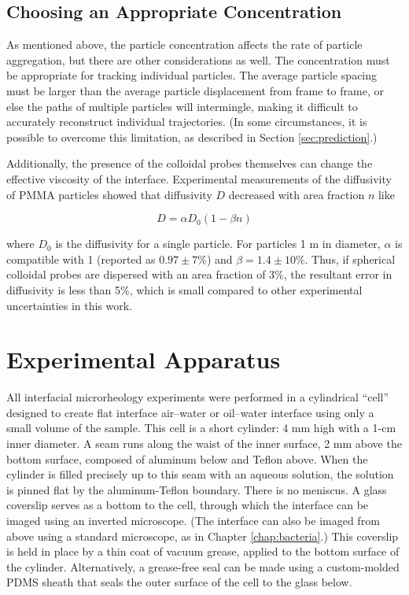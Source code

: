 \subsection{Choosing an Appropriate Concentration}

As mentioned above, the particle concentration affects the rate of particle aggregation, but there are other considerations as well. The concentration must be appropriate for tracking individual particles. The average particle spacing must be larger than the average particle displacement from frame to frame, or else the paths of multiple particles will intermingle, making it difficult to accurately reconstruct individual trajectories\cite{Crocker1996}. (In some circumstances, it is possible to overcome this limitation, as described in Section \ref{sec:prediction}.)

Additionally, the presence of the colloidal probes themselves can change the effective viscosity of the interface. Experimental measurements of the diffusivity of PMMA particles showed that diffusivity $D$ decreased with area fraction $n$ like

\begin{equation}
D = \alpha D_0(1 - \beta n)
\end{equation}

\noindent where $D_0$ is the diffusivity for a single particle. For particles 1 \textmu m in diameter, $\alpha$ is compatible with 1 (reported as $0.97 \pm 7\%$) and $\beta = 1.4 \pm 10\%$\cite{Peng2008a}. Thus, if spherical colloidal probes are dispersed with an area fraction of 3\%, the resultant error in diffusivity is less than 5\%, which is small compared to other experimental uncertainties in this work.

\section{Experimental Apparatus}

All interfacial microrheology experiments were performed in a cylindrical ``cell'' designed to create flat interface air--water or oil--water interface using only a small volume of the sample. This cell is a short cylinder: 4 mm high with a 1-cm inner diameter. A seam runs along the waist of the inner surface, 2 mm above the bottom surface, composed of aluminum below and Teflon above. When the cylinder is filled precisely up to this seam with an aqueous solution, the solution is pinned flat by the aluminum-Teflon boundary. There is no meniscus. A glass coverslip serves as a bottom to the cell, through which the interface can be imaged using an inverted microscope. (The interface can also be imaged from above using a standard microscope, as in Chapter \ref{chap:bacteria}.) This coverslip is held in place by a thin coat of vacuum grease, applied to the bottom surface of the cylinder. Alternatively, a grease-free seal can be made using a custom-molded PDMS sheath that seals the outer surface of the cell to the glass below.

